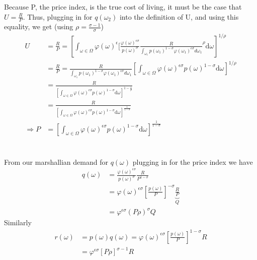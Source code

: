 \documentclass[10pt, final]{article}
\begin{document}
\begin{enumerate}[1.]
	Because P, the price index, is the true cost of living, it must be the case that $U = \frac{R}{P}$. Thus, plugging in for $q(\omega_2)$ into the definition of U, and using this equality, we get (using $\rho = \frac{\sigma - 1}{\sigma}$)
	\begin{align*}
		U &= \frac{R}{P} = \left[\int_{\omega\in\Omega} \varphi(\omega)^{\epsilon} [\frac{\varphi(\omega)^{\epsilon \sigma}}{p(\omega)^\sigma} \frac{R}{\int_{\omega_1} p(\omega_1)^{1-\sigma} \varphi(\omega_1)^{\epsilon \sigma} d \omega_1}^{\rho}\textrm{d}\omega\right]^{1/\rho} \\
		&= \frac{R}{P} = \frac{R}{\int_{\omega_1} p(\omega_1)^{1-\sigma} \varphi(\omega_1)^{\epsilon \sigma} d \omega_1} \left[\int_{\omega\in\Omega} \varphi(\omega)^{\epsilon \sigma} p(\omega)^{1-\sigma} \textrm{d}\omega\right]^{1/\rho} \\
		&= \frac{R}{[\int_{\omega\in\Omega} \varphi(\omega)^{\epsilon \sigma} p(\omega)^{1-\sigma} \textrm{d}\omega]^{1 - \frac{1}{\rho}}} \\
		&= \frac{R}{[\int_{\omega\in\Omega} \varphi(\omega)^{\epsilon \sigma} p(\omega)^{1-\sigma} \textrm{d}\omega] ^{\frac{1}{1-\sigma}}} \\
		\Rightarrow P &= [\int_{\omega\in\Omega} \varphi(\omega)^{\epsilon \sigma} p(\omega)^{1-\sigma} \textrm{d}\omega] ^{\frac{1}{1-\sigma}}
	\end{align*}
	\\
	\\
	From our marshallian demand for $q(\omega)$ plugging in for the price index we have
	\begin{align*}
		q(\omega) &= \frac{\varphi(\omega)^{\epsilon \sigma}}{p(\omega)^\sigma} \frac{R}{P^{1-\sigma}}  \\
		&= \varphi(\omega)^{\epsilon \sigma} [\frac{p(\omega)}{P}]^{-\sigma} \underbrace{\frac{R}{P}}_{Q} \\
		&= \varphi^{\epsilon \sigma}(P \rho)^\sigma Q
	\end{align*}
	Similarly
	\begin{align*}
		r(\omega) &= p(\omega) q(\omega) =  \varphi(\omega)^{\epsilon \sigma} [\frac{p(\omega)}{P}]^{1-\sigma} R \\
		&= \varphi^{\epsilon \sigma} [P \rho]^{\sigma-1} R
	\end{align*}


\end{enumerate}
\end{document}
